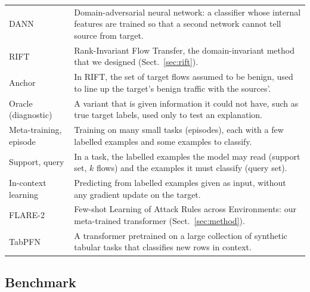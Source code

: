 \documentclass[11pt]{article}
\begin{document}
\begin{table}[t]
\begin{tabular}{p{}p{}}
DANN & Domain-adversarial neural network: a classifier whose internal features are trained so that a second network cannot tell source from target. \\
RIFT & Rank-Invariant Flow Transfer, the domain-invariant method that we designed (Sect.~\ref{sec:rift}). \\
Anchor & In RIFT, the set of target flows assumed to be benign, used to line up the target's benign traffic with the sources'. \\
Oracle (diagnostic) & A variant that is given information it could not have, such as true target labels, used only to test an explanation. \\
Meta-training, episode & Training on many small tasks (episodes), each with a few labelled examples and some examples to classify. \\
Support, query & In a task, the labelled examples the model may read (support set, $k$ flows) and the examples it must classify (query set). \\
In-context learning & Predicting from labelled examples given as input, without any gradient update on the target. \\
FLARE-2 & Few-shot Learning of Attack Rules across Environments: our meta-trained transformer (Sect.~\ref{sec:method}). \\
TabPFN & A transformer pretrained on a large collection of synthetic tabular tasks that classifies new rows in context. \\
\bottomrule
\end{tabular}
\end{table}

\subsection{Benchmark}\label{sec:benchdata}
\end{document}
